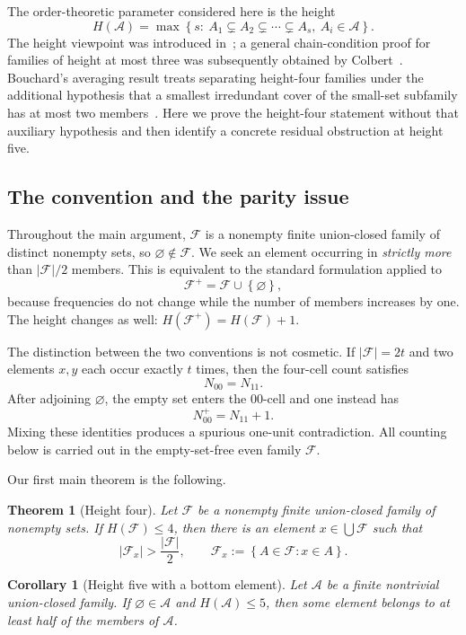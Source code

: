 \documentclass[11pt,reqno]{amsart}
\numberwithin{equation}{section}
\newtheorem{theorem}{Theorem}[section]
\newtheorem{corollary}[corollary]{Corollary}
\theoremstyle{definition}
\theoremstyle{remark}
\newcommand{\F}{\mathcal{F}}
\newcommand{\A}{\mathcal{A}}
\newcommand{\1}{\mathbf{1}}
\newcommand{\set}[1]{\left\{#1\right\}}
\newcommand{\abs}[1]{\left|#1\right|}
\begin{document}
The order-theoretic parameter considered here is the height
\[
H(\A)=\max\set{s:\ A_1\subsetneq A_2\subsetneq\cdots\subsetneq A_s,
\ A_i\in\A}.
\]
The height viewpoint was introduced in~\cite{TianHeight}; a general chain-condition proof for families of height at most three was subsequently obtained by Colbert~\cite{Colbert}.  Bouchard's averaging result treats separating height-four families under the additional hypothesis that a smallest irredundant cover of the small-set subfamily has at most two members~\cite{Bouchard}.  Here we prove the height-four statement without that auxiliary hypothesis and then identify a concrete residual obstruction at height five.

\subsection*{The convention and the parity issue}
Throughout the main argument, \(\F\) is a nonempty finite union-closed family of distinct nonempty sets, so \(\varnothing\notin\F\).  We seek an element occurring in \emph{strictly more} than \(\abs{\F}/2\) members.  This is equivalent to the standard formulation applied to
\[
\F^+=\F\cup\set{\varnothing},
\]
because frequencies do not change while the number of members increases by one.  The height changes as well: \(H(\F^+)=H(\F)+1\).

The distinction between the two conventions is not cosmetic.  If \(\abs{\F}=2t\) and two elements \(x,y\) each occur exactly \(t\) times, then the four-cell count satisfies
\[
N_{00}=N_{11}.
\]
After adjoining \(\varnothing\), the empty set enters the \(00\)-cell and one instead has
\[
N^{+}_{00}=N_{11}+1.
\]
Mixing these identities produces a spurious one-unit contradiction.  All counting below is carried out in the empty-set-free even family \(\F\).

Our first main theorem is the following.

\begin{theorem}[Height four]\label{thm:main-height4}
Let \(\F\) be a nonempty finite union-closed family of nonempty sets.  If \(H(\F)\le 4\), then there is an element \(x\in\bigcup\F\) such that
\[
\abs{\F_x}>\frac{\abs{\F}}2,
\qquad
\F_x:=\set{A\in\F:x\in A}.
\]
\end{theorem}

\begin{corollary}[Height five with a bottom element]\label{cor:height5-bottom}
Let \(\A\) be a finite nontrivial union-closed family.  If \(\varnothing\in\A\) and \(H(\A)\le5\), then some element belongs to at least half of the members of \(\A\).
\end{corollary}
\end{document}
